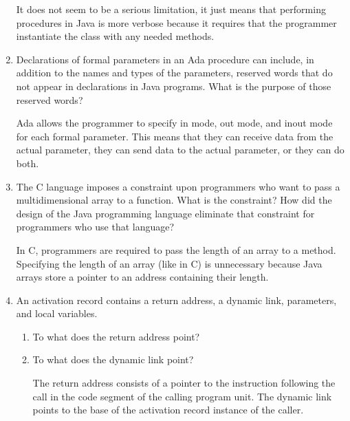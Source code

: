 \begin{enumerate}
\begin{answer}
It does not seem to be a serious limitation, it just means that performing procedures
 in Java is more verbose because it requires that the programmer instantiate the
 class with any needed methods.


    \end{answer}

  \item Declarations of formal parameters in an Ada procedure
    can include, in addition to the names and types of the
    parameters, reserved words that do not appear in declarations
    in Java programs. 
    What is the purpose of those reserved words?

\begin{answer}

Ada allows the programmer to specify in mode, out mode, and inout mode for each
 formal parameter.  This means that they can receive data from the actual parameter,
 they can send data to the actual parameter, or they can do both.

    \end{answer}
 
  \item The C language imposes a constraint upon programmers
    who want to pass a multidimensional array to a function.
    What is the constraint? How did the design of the Java
    programming language eliminate that constraint for 
    programmers who use that language?

\begin{answer}

    In C, programmers are required to pass the length of an array to a method.
 Specifying the length of an array (like in C) is unnecessary because Java arrays
 store a pointer to an address containing their length.

    \end{answer}

  \item An activation record contains a return
    address, a dynamic link, parameters, and
    local variables.
  \begin{enumerate}
    \item To what does the return address point?
    \item To what does the dynamic link point?

\begin{answer}

    The return address consists of a pointer to the instruction following the call
in the code segment of the calling program unit.  The dynamic link points to the base
of the activation record instance of the caller.


\end{answer}
\end{enumerate}
\end{enumerate}
